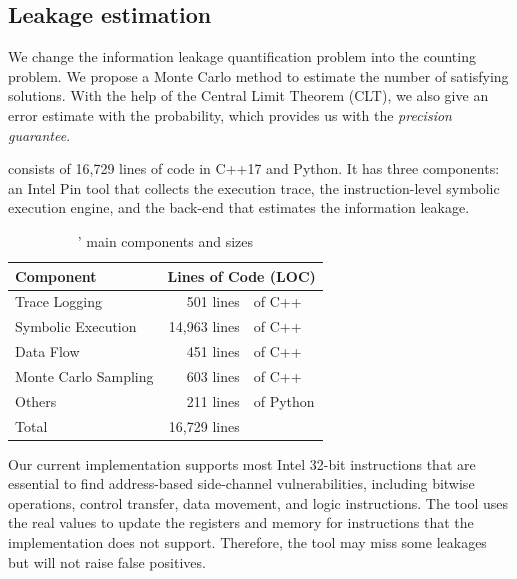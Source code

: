 \subsection{Leakage estimation} We change the information leakage 
quantification problem into the counting problem. We propose a
Monte Carlo method to estimate the number of satisfying solutions.
With the help of the Central Limit Theorem (CLT), we also give an error 
estimate with the probability, which provides us with the \emph{precision guarantee}.

\tool{} consists of 16,729 lines of code in C++17 and Python. It has three
components: an Intel Pin tool that collects the execution trace, the
instruction-level symbolic execution engine, and the back-end that estimates
the information leakage.

\begin{table}[h!]
    \centering
    \caption{\tool{}' main components and sizes}\label{tbl:implementation}
    \begin{tabular}{lr@{~}@{}l}
        \hline
        Component            & \multicolumn{2}{c}{Lines of Code (LOC)}             \\ \hline
        Trace Logging        & 501 lines                               & of C++    \\
        Symbolic Execution   & 14,963 lines                            & of C++    \\
        Data Flow            & 451 lines                               & of C++    \\
        Monte Carlo Sampling & 603 lines                               & of C++    \\
        Others               & 211 lines                               & of Python \\ \hline
        Total                & 16,729 lines                            &           \\\hline
    \end{tabular}
\end{table}

Our current implementation supports most Intel 32-bit instructions that are essential to find address-based side-channel
vulnerabilities, including bitwise operations, control transfer, data movement, and logic
instructions. The tool uses the real values to update the registers and memory for instructions that the implementation does not support.
Therefore, the tool may miss some leakages but will not raise false positives.

